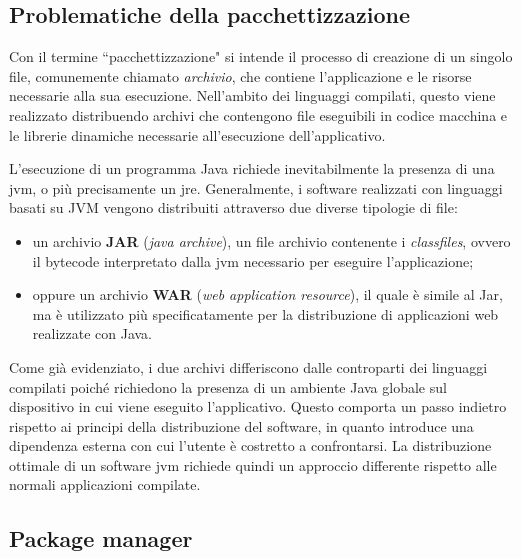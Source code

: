 \subsection{Problematiche della pacchettizzazione}
Con il termine ``pacchettizzazione" si intende il processo di creazione di un singolo file, comunemente chiamato \textit{archivio}, che contiene l'applicazione e le risorse necessarie alla sua esecuzione. Nell'ambito dei linguaggi compilati, questo viene realizzato distribuendo archivi che contengono file eseguibili in codice macchina e le librerie dinamiche necessarie all'esecuzione dell'applicativo.

L'esecuzione di un programma Java richiede inevitabilmente la presenza di una \ac{jvm}, o più precisamente un \ac{jre}. Generalmente, i software realizzati con linguaggi basati su JVM vengono distribuiti attraverso due diverse tipologie di file:
\begin{itemize}
	\item un archivio \textbf{JAR} (\textit{java archive}), un file archivio contenente i \textit{classfiles}, ovvero il bytecode interpretato dalla \ac{jvm} necessario per eseguire l'applicazione;
	\item oppure un archivio \textbf{WAR} (\textit{web application resource}), il quale è simile al Jar, ma è utilizzato più specificatamente per la distribuzione di applicazioni web realizzate con Java.
\end{itemize}
Come già evidenziato, i due archivi differiscono dalle controparti dei linguaggi compilati poiché richiedono la presenza di un ambiente Java globale sul dispositivo in cui viene eseguito l'applicativo. Questo comporta un passo indietro rispetto ai principi della distribuzione del software, in quanto introduce una dipendenza esterna con cui l'utente è costretto a confrontarsi. La distribuzione ottimale di un software \ac{jvm} richiede quindi un approccio differente rispetto alle normali applicazioni compilate.

\subsection{Package manager}


